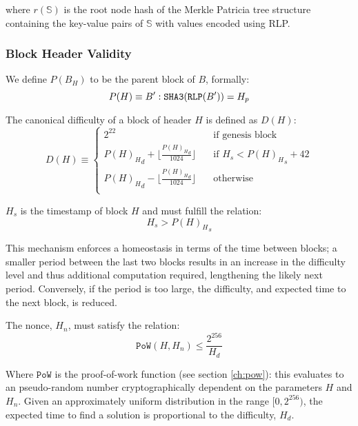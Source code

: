 \documentclass[9pt,oneside]{amsart}
\begin{document}
\begin{multicols}{2}
where $r(\mathbb{S})$ is the root node hash of the Merkle Patricia tree structure containing the key-value pairs of $\mathbb{S}$ with values encoded using RLP.

\subsubsection{Block Header Validity}

We define $P(B_H)$ to be the parent block of $B$, formally:
\begin{equation}
P(H) \equiv B': \mathtt{\tiny SHA3}(\mathtt{\tiny RLP}(B')) = H_p
\end{equation}

The canonical difficulty of a block of header $H$ is defined as $D(H)$:
\begin{equation}
D(H) \equiv \begin{cases}
2^{22} & \quad \text{if genesis block}\\
{P(H)_H}_d + \lfloor\frac{{P(H)_H}_d}{1024}\rfloor & \quad \text{if $H_s < {P(H)_H}_s + 42$}\\
{P(H)_H}_d - \lfloor\frac{{P(H)_H}_d}{1024}\rfloor & \quad \text{otherwise}\\
\end{cases}
\end{equation}

$H_s$ is the timestamp of block $H$ and must fulfill the relation:
\begin{equation}
H_s > {P(H)_H}_s
\end{equation}

This mechanism enforces a homeostasis in terms of the time between blocks; a smaller period between the last two blocks results in an increase in the difficulty level and thus additional computation required, lengthening the likely next period. Conversely, if the period is too large, the difficulty, and expected time to the next block, is reduced.

The nonce, $H_n$, must satisfy the relation:
\begin{equation}
\mathtt{PoW}(H, H_n) \leqslant \frac{2^{256}}{H_d}
\end{equation}

Where $\mathtt{PoW}$ is the proof-of-work function (see section \ref{ch:pow}): this evaluates to an pseudo-random number cryptographically dependent on the parameters $H$ and $H_n$. Given an approximately uniform distribution in the range $[0, 2^{256})$, the expected time to find a solution is proportional to the difficulty, $H_d$.


\end{multicols}
\end{document}

